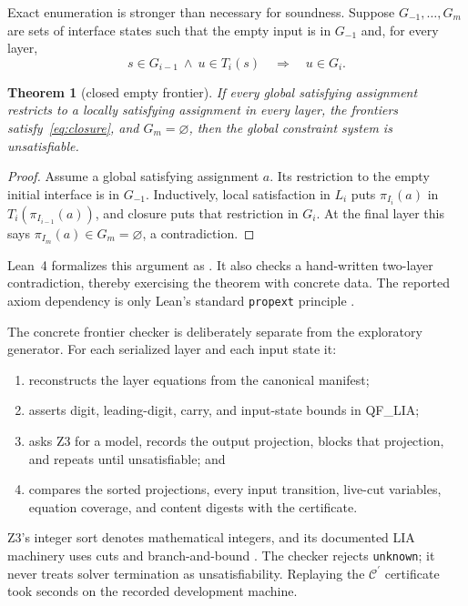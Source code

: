 \documentclass[11pt]{article}
\newtheorem{theorem}{Theorem}
\newcommand{\Ccore}{\ensuremath{\mathcal{C}^{\prime}}}
\begin{document}
Exact enumeration is stronger than necessary for soundness.  Suppose
$G_{-1},\ldots,G_m$ are sets of interface states such that the empty input is
in $G_{-1}$ and, for every layer,
\begin{equation}\label{eq:closure}
  s\in G_{i-1}\ \wedge\ u\in T_i(s)\quad\Longrightarrow\quad u\in G_i.
\end{equation}

\begin{theorem}[closed empty frontier]\label{thm:soundness}
If every global satisfying assignment restricts to a locally satisfying
assignment in every layer, the frontiers satisfy~\eqref{eq:closure}, and
$G_m=\varnothing$, then the global constraint system is unsatisfiable.
\end{theorem}

\begin{proof}
Assume a global satisfying assignment $a$.  Its restriction to the empty
initial interface is in $G_{-1}$.  Inductively, local satisfaction in $L_i$
puts $\pi_{I_i}(a)$ in $T_i(\pi_{I_{i-1}}(a))$, and closure puts that
restriction in $G_i$.  At the final layer this says
$\pi_{I_m}(a)\in G_m=\varnothing$, a contradiction.
\end{proof}

Lean~4 formalizes this argument as \GenericSoundnessTheorem.  It also checks a
hand-written two-layer contradiction, thereby exercising the theorem with
concrete data.  The reported axiom dependency is only Lean's standard
\texttt{propext} principle \cite{deMouraUllrich2021}.

The concrete frontier checker is deliberately separate from the exploratory
generator.  For each serialized layer and each input state it:
\begin{enumerate}[leftmargin=*,nosep]
  \item reconstructs the layer equations from the canonical manifest;
  \item asserts digit, leading-digit, carry, and input-state bounds in QF\_LIA;
  \item asks Z3 for a model, records the output projection, blocks that
        projection, and repeats until unsatisfiable; and
  \item compares the sorted projections, every input transition, live-cut
        variables, equation coverage, and content digests with the certificate.
\end{enumerate}
Z3's integer sort denotes mathematical integers, and its documented LIA
machinery uses cuts and branch-and-bound \cite{z3Arithmetic}.  The checker
rejects \texttt{unknown}; it never treats solver termination as
unsatisfiability.  Replaying the \Ccore{} certificate took
\CoreReplaySeconds{} seconds on the recorded development machine.
\end{document}
